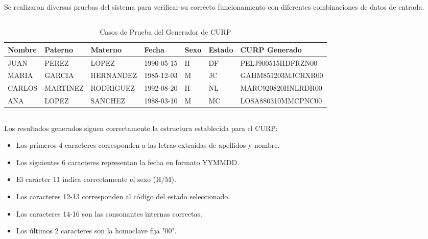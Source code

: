 \documentclass[10pt,a4paper]{article}
\begin{document}
\pagebreak

\section{\color{colorIPN}{Resultados y Pruebas}}
Se realizaron diversas pruebas del sistema para verificar su correcto funcionamiento con diferentes combinaciones de datos de entrada.

\subsection{\color{colorESCOM}{Casos de Prueba}}
\begin{table}[H]
	\centering
	\hspace*{0pt}
	\begin{tabular}{|p{2.5cm}|p{2cm}|p{2cm}|p{2cm}|p{1.5cm}|p{2cm}|p{2.2cm}|}
		\hline
		\textbf{Nombre} & \textbf{Paterno} & \textbf{Materno} & \textbf{Fecha} & \textbf{Sexo} & \textbf{Estado} & \textbf{CURP Generado} \\ \hline
		JUAN & PEREZ & LOPEZ & 1990-05-15 & H & DF & PELJ900515HDFRZN00 \\ \hline
		MARIA & GARCIA & HERNANDEZ & 1985-12-03 & M & JC & GAHM851203MJCRXR00 \\ \hline
		CARLOS & MARTINEZ & RODRIGUEZ & 1992-08-20 & H & NL & MARC920820HNLRDR00 \\ \hline
		ANA & LOPEZ & SANCHEZ & 1988-03-10 & M & MC & LOSA880310MMCPNC00 \\ \hline
	\end{tabular}
	\caption{Casos de Prueba del Generador de CURP}
	\label{tab:casos_prueba}
\end{table}

\subsection{\color{colorESCOM}{Validación de Resultados}}
Los resultados generados siguen correctamente la estructura establecida para el CURP:
\begin{itemize}
	\item Los primeros 4 caracteres corresponden a las letras extraídas de apellidos y nombre.
	\item Los siguientes 6 caracteres representan la fecha en formato YYMMDD.
	\item El carácter 11 indica correctamente el sexo (H/M).
	\item Los caracteres 12-13 corresponden al código del estado seleccionado.
	\item Los caracteres 14-16 son las consonantes internas correctas.
	\item Los últimos 2 caracteres son la homoclave fija "00".
\end{itemize}
\end{document}

